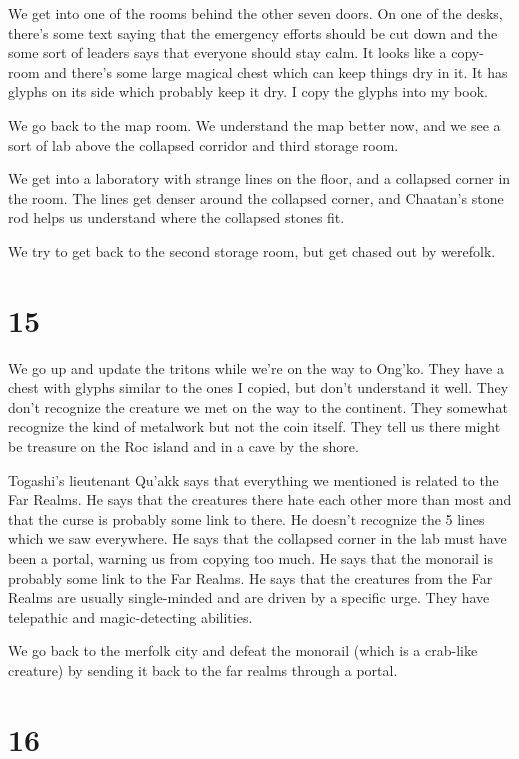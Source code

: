 \documentclass[10pt,a4paper,twoside,openany,hidelinks]{book}
\begin{document}
We get into one of the rooms behind the other seven doors. On one of the desks, there's some text saying that the emergency efforts should be cut down and the some sort of leaders says that everyone should stay calm. It looks like a copy-room and there's some large magical chest which can keep things dry in it. It has glyphs on its side which probably keep it dry. I copy the glyphs into my book.

We go back to the map room. We understand the map better now, and we see a sort of lab above the collapsed corridor and third storage room.

We get into a laboratory with strange lines on the floor, and a collapsed corner in the room. The lines get denser around the collapsed corner, and Chaatan's stone rod helps us understand where the collapsed stones fit.

We try to get back to the second storage room, but get chased out by werefolk.

\chapter*{15}

We go up and update the tritons while we're on the way to Ong'ko. They have a chest with glyphs similar to the ones I copied, but don't understand it well. They don't recognize the creature we met on the way to the continent. They somewhat recognize the kind of metalwork but not the coin itself. They tell us there might be treasure on the Roc island and in a cave by the shore.

Togashi's lieutenant Qu'akk says that everything we mentioned is related to the Far Realms. He says that the creatures there hate each other more than most and that the curse is probably some link to there. 
He doesn't recognize the 5 lines which we saw everywhere. He says that the collapsed corner in the lab must have been a portal, warning us from copying too much. He says that the monorail is probably some link to the Far Realms. He says that the creatures from the Far Realms are usually single-minded and are driven by a specific urge. They have telepathic and magic-detecting abilities. 

We go back to the merfolk city and defeat the monorail (which is a crab-like creature) by sending it back to the far realms through a portal.

\chapter*{16}
\end{document}
